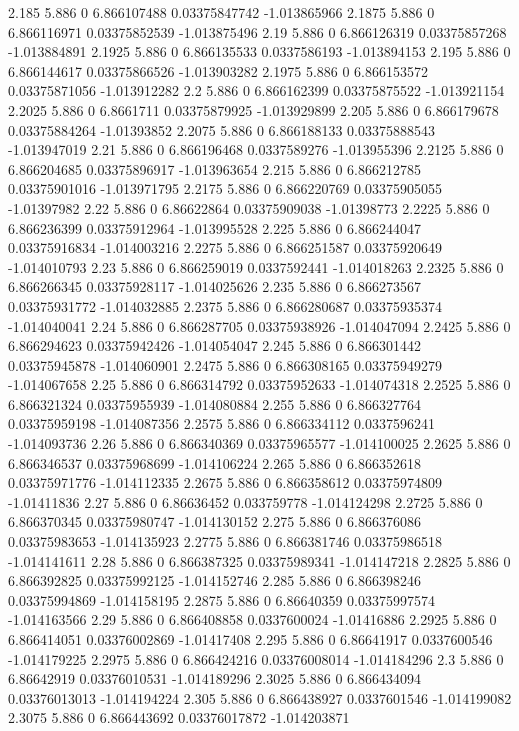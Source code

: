 {2.185 5.886 0 6.866107488 0.03375847742 -1.013865966
2.1875 5.886 0 6.866116971 0.03375852539 -1.013875496
2.19 5.886 0 6.866126319 0.03375857268 -1.013884891
2.1925 5.886 0 6.866135533 0.0337586193 -1.013894153
2.195 5.886 0 6.866144617 0.03375866526 -1.013903282
2.1975 5.886 0 6.866153572 0.03375871056 -1.013912282
2.2 5.886 0 6.866162399 0.03375875522 -1.013921154
2.2025 5.886 0 6.8661711 0.03375879925 -1.013929899
2.205 5.886 0 6.866179678 0.03375884264 -1.01393852
2.2075 5.886 0 6.866188133 0.03375888543 -1.013947019
2.21 5.886 0 6.866196468 0.0337589276 -1.013955396
2.2125 5.886 0 6.866204685 0.03375896917 -1.013963654
2.215 5.886 0 6.866212785 0.03375901016 -1.013971795
2.2175 5.886 0 6.866220769 0.03375905055 -1.01397982
2.22 5.886 0 6.86622864 0.03375909038 -1.01398773
2.2225 5.886 0 6.866236399 0.03375912964 -1.013995528
2.225 5.886 0 6.866244047 0.03375916834 -1.014003216
2.2275 5.886 0 6.866251587 0.03375920649 -1.014010793
2.23 5.886 0 6.866259019 0.0337592441 -1.014018263
2.2325 5.886 0 6.866266345 0.03375928117 -1.014025626
2.235 5.886 0 6.866273567 0.03375931772 -1.014032885
2.2375 5.886 0 6.866280687 0.03375935374 -1.014040041
2.24 5.886 0 6.866287705 0.03375938926 -1.014047094
2.2425 5.886 0 6.866294623 0.03375942426 -1.014054047
2.245 5.886 0 6.866301442 0.03375945878 -1.014060901
2.2475 5.886 0 6.866308165 0.03375949279 -1.014067658
2.25 5.886 0 6.866314792 0.03375952633 -1.014074318
2.2525 5.886 0 6.866321324 0.03375955939 -1.014080884
2.255 5.886 0 6.866327764 0.03375959198 -1.014087356
2.2575 5.886 0 6.866334112 0.0337596241 -1.014093736
2.26 5.886 0 6.866340369 0.03375965577 -1.014100025
2.2625 5.886 0 6.866346537 0.03375968699 -1.014106224
2.265 5.886 0 6.866352618 0.03375971776 -1.014112335
2.2675 5.886 0 6.866358612 0.03375974809 -1.01411836
2.27 5.886 0 6.86636452 0.033759778 -1.014124298
2.2725 5.886 0 6.866370345 0.03375980747 -1.014130152
2.275 5.886 0 6.866376086 0.03375983653 -1.014135923
2.2775 5.886 0 6.866381746 0.03375986518 -1.014141611
2.28 5.886 0 6.866387325 0.03375989341 -1.014147218
2.2825 5.886 0 6.866392825 0.03375992125 -1.014152746
2.285 5.886 0 6.866398246 0.03375994869 -1.014158195
2.2875 5.886 0 6.86640359 0.03375997574 -1.014163566
2.29 5.886 0 6.866408858 0.0337600024 -1.01416886
2.2925 5.886 0 6.866414051 0.03376002869 -1.01417408
2.295 5.886 0 6.86641917 0.0337600546 -1.014179225
2.2975 5.886 0 6.866424216 0.03376008014 -1.014184296
2.3 5.886 0 6.86642919 0.03376010531 -1.014189296
2.3025 5.886 0 6.866434094 0.03376013013 -1.014194224
2.305 5.886 0 6.866438927 0.0337601546 -1.014199082
2.3075 5.886 0 6.866443692 0.03376017872 -1.014203871
}
